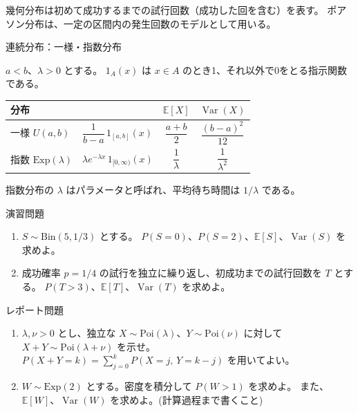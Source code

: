 \documentclass[a4paper,10pt,pdflatex,ja=standard,jafont=ipaex-type1,
  magstyle=real,scale=1]{bxjsarticle}
\newcommand{\topic}[1]{\par\vspace{5pt}
  {\large\sffamily\mdseries\color{accent}#1}\par\vspace{2pt}}
\newcommand{\examplelabel}[1]{{\sffamily\mdseries\color{ink}#1}}
\newcommand{\R}{\mathbb R}
\newcommand{\E}{\mathbb E}
\newcommand{\Var}{\operatorname{Var}}
\begin{document}
幾何分布は初めて成功するまでの試行回数（成功した回を含む）を表す。
ポアソン分布は、一定の区間内の発生回数のモデルとして用いる。

\topic{連続分布：一様・指数分布}
$a<b$、$\lambda>0$ とする。
$1_A(x)$ は $x\in A$ のとき1、それ以外で0をとる指示関数である。

\begingroup
\setlength{\tabcolsep}{5pt}
\renewcommand{\arraystretch}{1.75}
\begin{tabularx}{\linewidth}{@{}l >{\centering\arraybackslash}X c c@{}}
\toprule
\examplelabel{分布} & \leavevmode\examplelabel{密度 $f(x)$（$x\in\R$）}
  & \examplelabel{$\E[X]$} & \examplelabel{$\Var(X)$} \\
\midrule
一様 $U(a,b)$ & $\dfrac{1}{b-a}\,1_{[a,b]}(x)$ & $\dfrac{a+b}{2}$ & $\dfrac{(b-a)^2}{12}$ \\
指数 $\mathrm{Exp}(\lambda)$ & $\lambda e^{-\lambda x}\,1_{[0,\infty)}(x)$ & $\dfrac1\lambda$ & $\dfrac1{\lambda^2}$ \\
\bottomrule
\end{tabularx}
\par\endgroup
\smallskip
指数分布の $\lambda$ はパラメータと呼ばれ、平均待ち時間は $1/\lambda$ である。

\topic{演習問題}
\begin{enumerate}[label=\arabic*.]
  \item $S\sim\mathrm{Bin}(5,1/3)$ とする。
  $P(S=0)$、$P(S=2)$、$\E[S]$、$\Var(S)$ を求めよ。
  \item 成功確率 $p=1/4$ の試行を独立に繰り返し、初成功までの試行回数を $T$ とする。
  $P(T>3)$、$\E[T]$、$\Var(T)$ を求めよ。
\end{enumerate}

\topic{レポート問題}
\begin{enumerate}[label=\arabic*.]
  \item $\lambda,\nu>0$ とし、独立な $X\sim\mathrm{Poi}(\lambda)$、$Y\sim\mathrm{Poi}(\nu)$ に対して
  $X+Y\sim\mathrm{Poi}(\lambda+\nu)$ を示せ。
  $P(X+Y=k)=\sum_{j=0}^kP(X=j,\,Y=k-j)$ を用いてよい。
    \item $W\sim\mathrm{Exp}(2)$ とする。密度を積分して $P(W>1)$ を求めよ。
  また、$\E[W]$、$\Var(W)$ を求めよ。(計算過程まで書くこと)
\end{enumerate}
\end{document}
